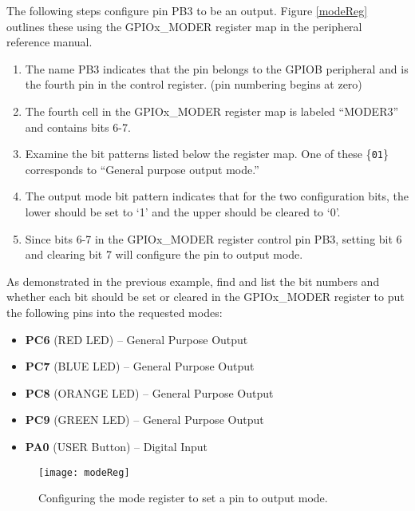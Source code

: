 \documentclass[11pt,fleqn]{book} %
\begin{document}
\begin{example}
    The following steps configure pin PB3 to be an output. Figure \vref{modeReg} outlines these using the GPIOx\_MODER register map in the peripheral reference manual.
    \begin{enumerate}
        \item The name PB3 indicates that the pin belongs to the GPIOB peripheral and is the fourth pin in the control register. (pin numbering begins at zero)
        \item The fourth cell in the GPIOx\_MODER register map is labeled ``MODER3'' and contains bits 6-7.
        \item Examine the bit patterns listed below the register map. One of these \{\texttt{01}\} corresponds to ``General purpose output mode.''
        \item The output mode bit pattern indicates that for the two configuration bits, the lower should be set to `1' and the upper should be cleared to `0'.
        \item Since bits 6-7 in the GPIOx\_MODER register control pin PB3, setting bit 6 and clearing bit 7 will configure the pin to output mode. 
    \end{enumerate}  
\end{example}

\begin{exercise}
    
    As demonstrated in the previous example, find and list the bit numbers and whether each bit should be set or cleared in the GPIOx\_MODER register to put the following pins into the requested modes:
    
    \begin{itemize}
        \item \textbf{PC6} (RED LED) -- General Purpose Output 
        \item \textbf{PC7} (BLUE LED) -- General Purpose Output 
        \item \textbf{PC8} (ORANGE LED) -- General Purpose Output 
        \item \textbf{PC9} (GREEN LED) -- General Purpose Output 
        \item \textbf{PA0} (USER Button) -- Digital Input  
    \end{itemize}
\end{exercise}

\begin{figure}[]
    \centering\texttt{[image: modeReg]}
    \caption{Configuring the mode register to set a pin to output mode.}
    \label{modeReg}
\end{figure}
\end{document}
